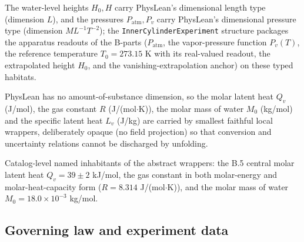 \begin{definition}
\label{def:IPhO2026Problems_problem_IPhO_2026_4_B_6:DimLength}
The water-level heights $H_0, H$ carry PhysLean's dimensional length type
(dimension $L$), and the pressures $P_{\mathrm{atm}}, P_v$ carry PhysLean's
dimensional pressure type (dimension $M L^{-1} T^{-2}$); the
\texttt{InnerCylinderExperiment} structure packages the apparatus readouts of
the B-parts ($P_{\mathrm{atm}}$, the vapor-pressure function $P_v(T)$, the
reference temperature $T_0 = 273.15$ K with its real-valued readout, the
extrapolated height $H_0$, and the vanishing-extrapolation anchor) on these
typed habitats.
\end{definition}

\begin{definition}
\label{def:IPhO2026Problems_problem_IPhO_2026_4_B_6:MolarEnergy}
PhysLean has no amount-of-substance dimension, so the molar latent heat
$Q_v$ (J/mol), the gas constant $R$ (J/(mol$\cdot$K)), the molar mass of
water $M_0$ (kg/mol) and the specific latent heat $L_v$ (J/kg) are carried
by smallest faithful local wrappers, deliberately opaque (no field
projection) so that conversion and uncertainty relations cannot be
discharged by unfolding.
\end{definition}

\begin{definition}
\label{def:IPhO2026Problems_problem_IPhO_2026_4_B_6:catalog_opaques}
Catalog-level named inhabitants of the abstract wrappers: the B.5 central
molar latent heat $Q_v = 39 \pm 2$ kJ/mol, the gas constant in both
molar-energy and molar-heat-capacity form
($R = 8.314$ J/(mol$\cdot$K)), and the molar mass of water
$M_0 = 18.0 \times 10^{-3}$ kg/mol.
\end{definition}

\subsection*{Governing law and experiment data}

